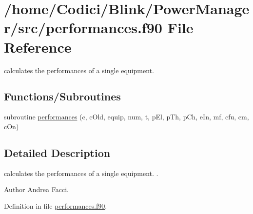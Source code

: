\hypertarget{performances_8f90}{\section{/home/\-Codici/\-Blink/\-Power\-Manager/src/performances.f90 File Reference}
\label{performances_8f90}
}


calculates the performances of a single equipment.  


\subsection*{Functions/\-Subroutines}
\begin{DoxyCompactItemize}
\item 
subroutine \hyperlink{performances_8f90_a84c9587b317772dca6d4c6ac4827aa3d}{performances} (c, c\-Old, equip, num, t, p\-El, p\-Th, p\-Ch, e\-In, mf, cfu, cm, c\-On)
\end{DoxyCompactItemize}


\subsection{Detailed Description}
calculates the performances of a single equipment. . \begin{DoxyAuthor}{Author}
Andrea Facci. 
\end{DoxyAuthor}


Definition in file \hyperlink{performances_8f90_source}{performances.\-f90}.



